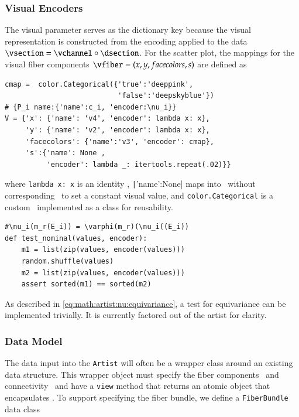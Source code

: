 \documentclass[journal]{vgtc}                %
\begin{document}
\subsubsection{Visual Encoders}
The visual parameter serves as the dictionary key because the visual representation is constructed from the encoding applied to the data  $\vsection = \vchannel \circ \dsection$. For the scatter plot, the mappings for the visual fiber components $\vfiber=(x,y, facecolors, s)$ are defined as
\begin{verbatim}
cmap =  color.Categorical({'true':'deeppink', 
                           'false':'deepskyblue'}) 
# {P_i name:{'name':c_i, 'encoder:\nu_i}}
V = {'x': {'name': 'v4', 'encoder': lambda x: x}, 
     'y': {'name': 'v2', 'encoder': lambda x: x},
     'facecolors': {'name':'v3', 'encoder': cmap}, 
     's':{'name': None , 
          'encoder': lambda _: itertools.repeat(.02)}}
\end{verbatim}
where \texttt{lambda x: x} is an identity \vchannel, \texttt|{'name':None}| maps into \vfiber\ without corresponding \dsection\ to set a constant visual value, and \texttt{color.Categorical} is a custom \vchannel\ implemented as a class for reusability. 
\begin{verbatim}
#\nu_i(m_r(E_i)) = \varphi(m_r)(\nu_i((E_i))
def test_nominal(values, encoder):
    m1 = list(zip(values, encoder(values)))
    random.shuffle(values)
    m2 = list(zip(values, encoder(values)))
    assert sorted(m1) == sorted(m2)
\end{verbatim}
As described in \autoref{eq:math:artist:nu:equivariance}, a test for equivariance can be implemented trivially. It is currently factored out of the artist for clarity. 

\subsubsection{Data Model}
The data input into the \texttt{Artist} will often be a wrapper class around an existing data structure. This wrapper object must specify the fiber components \dfiber\ and connectivity \dbase\ and have a \texttt{view} method that returns an atomic object that encapsulates \dsection. To support specifying the fiber bundle, we define a \texttt{FiberBundle} data class\cite{DataclassesDataClasses}
\end{document}

